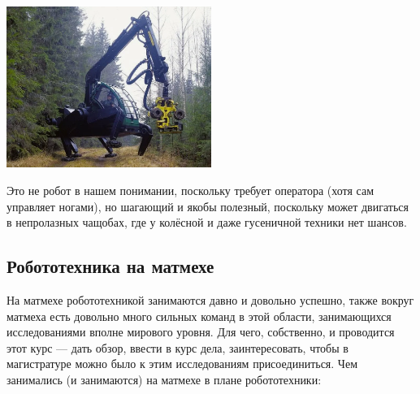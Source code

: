 \documentclass{../../text-style}
\begin{document}
\begin{itemize}
    \begin{center}
        \includegraphics[width=0.5\textwidth]{plustechWalker.png}
    \end{center}
    Это не робот в нашем понимании, поскольку требует оператора (хотя сам управляет ногами), но шагающий и якобы полезный, поскольку может двигаться в непролазных чащобах, где у колёсной и даже гусеничной техники нет шансов.
\end{itemize}

\subsection{Робототехника на матмехе}

На матмехе робототехникой занимаются давно и довольно успешно, также вокруг матмеха есть довольно много сильных команд в этой области, занимающихся исследованиями вполне мирового уровня.
Для чего, собственно, и проводится этот курс --- дать обзор, ввести в курс дела, заинтересовать, чтобы в магистратуре можно было к этим исследованиям присоединиться.
Чем занимались (и занимаются) на матмехе в плане робототехники:
\end{document}
